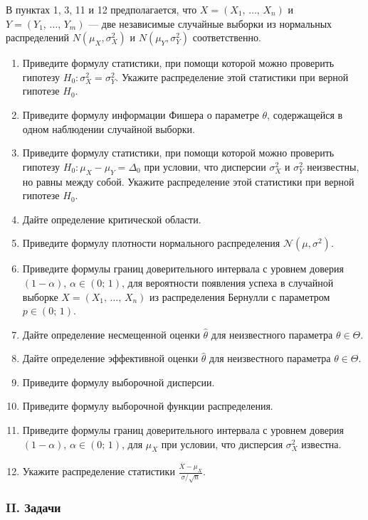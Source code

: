 \documentclass[12pt, a4paper]{article}\usepackage[]{graphicx}\usepackage[]{color}
\newcommand{\cN}{\mathcal{N}}
\begin{document}
В пунктах 1, 3, 11 и 12 предполагается, что $X = (X_1, \, \ldots, \, X_n)$ и $Y = (Y_1, \, \ldots, \, Y_m)$ — две независимые случайные выборки из нормальных распределений $N(\mu_X, \sigma_X^2)$ и $N(\mu_Y, \sigma_Y^2)$ соответственно.

\begin{enumerate}
  \item Приведите формулу статистики, при помощи которой можно проверить гипотезу $H_0 \colon \sigma_X^2 = \sigma_Y^2$. Укажите распределение этой статистики при верной гипотезе $H_0$.
  \item Приведите формулу информации Фишера о параметре $\theta$, содержащейся в одном наблюдении случайной выборки.
  \item Приведите формулу статистики, при помощи которой можно проверить гипотезу $H_0 \colon \mu_X - \mu_Y = \Delta_0$ при условии, что дисперсии $\sigma_X^2$ и $\sigma_Y^2$ неизвестны, но равны между собой. Укажите распределение этой статистики при верной гипотезе $H_0$.
  \item Дайте определение критической области.
  \item Приведите формулу плотности нормального распределения $\cN(\mu, \sigma^2)$.
  \item Приведите формулы границ доверительного интервала с уровнем доверия $(1 - \alpha)$, $\alpha \in (0;\,1)$, для вероятности появления успеха в случайной выборке $X = (X_1, \, \ldots, \, X_n)$ из распределения Бернулли с параметром $p \in (0;\,1)$.
  \item Дайте определение несмещенной оценки $\widehat{\theta}$ для неизвестного параметра $\theta \in \Theta$.
  \item Дайте определение эффективной оценки $\widehat{\theta}$ для неизвестного параметра $\theta \in \Theta$.
  \item Приведите формулу выборочной дисперсии.
  \item Приведите формулу выборочной функции распределения.
  \item Приведите формулы границ доверительного интервала с уровнем доверия $(1 - \alpha)$, $\alpha \in (0;\,1)$, для $\mu_X$ при условии, что дисперсия $\sigma_X^2$ известна.
  \item Укажите распределение статистики $\frac{\overline{X} - \mu_X}{\sigma / \sqrt{n}}$.
\end{enumerate}


\subsubsection*{II. Задачи}
\end{document}
